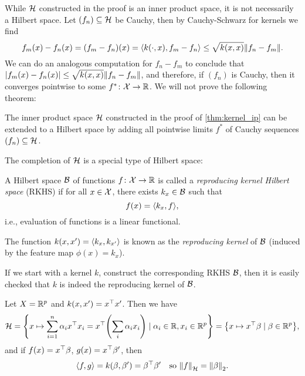 While $\mathcal H$ constructed in the proof is an inner product space, it is not necessarily a Hilbert space. Let $(f_n) \subseteq \mathcal H$ be Cauchy, then by Cauchy-Schwarz for kernels we find
\[
f_m(x) - f_n(x) = (f_m - f_n)(x) = \langle k(\cdot, x), f_m - f_n\rangle \leq \sqrt{k(x, x)} \norm{f_n - f_m}. 
\]
We can do an analogous computation for $f_n - f_m$ to conclude that $\abs{f_m(x) - f_n(x)} \leq \sqrt{k(x, x)} \norm{f_n - f_m}$, and therefore, if $(f_n)$ is Cauchy, then it converges pointwise to some $f^* \colon \mathcal X \to \mathbb R$. We will not prove the following theorem:
\begin{theorem}
    The inner product space $\mathcal H$ constructed in the proof of \cref{thm:kernel_ip} can be extended to a Hilbert space by adding all pointwise limits $f^*$ of Cauchy sequences $(f_n) \subseteq \mathcal H$. 
\end{theorem}

The completion of $\mathcal H$ is a special type of Hilbert space:
\begin{definition}
    A Hilbert space $\mathcal B$ of functions $f \colon \mathcal X \to \mathbb R$ is called a \emph{reproducing kernel Hilbert space} (RKHS) if for all $x \in \mathcal X$, there exists $k_x \in \mathcal B$ such that 
    \[
    f(x) = \langle k_x, f\rangle, 
    \]
    i.e., evaluation of functions is a linear functional. 
    
    The function $k(x, x') = \langle k_x, k_{x'}\rangle$ is known as the \emph{reproducing kernel} of $\mathcal B$ (induced by the feature map $\phi(x) = k_x$). 
\end{definition}

If we start with a kernel $k$, construct the corresponding RKHS $\mathcal B$, then it is easily checked that $k$ is indeed the reproducing kernel of $\mathcal B$. 

\begin{example}
    Let $X = \mathbb R^p$ and $k(x, x') = x^\top x'$. Then we have 
    \[
    \mathcal H = \qty{x \mapsto \sum_{i=1}^n \alpha_i x^\top x_i = x^\top\qty(\sum_i \alpha_i x_i) \mid \alpha_i \in \mathbb R, x_i \in \mathbb R^p} = \qty{x \mapsto x^\top\beta \mid \beta \in \mathbb R^p},
    \]
    and if $f(x) = x^\top\beta$, $g(x) = x^\top \beta'$, then 
    \[
    \langle f, g\rangle = k(\beta, \beta') = \beta^\top \beta' \quad\text{so } \norm{f}_\mathcal H = \norm{\beta}_2. 
    \]
\end{example}